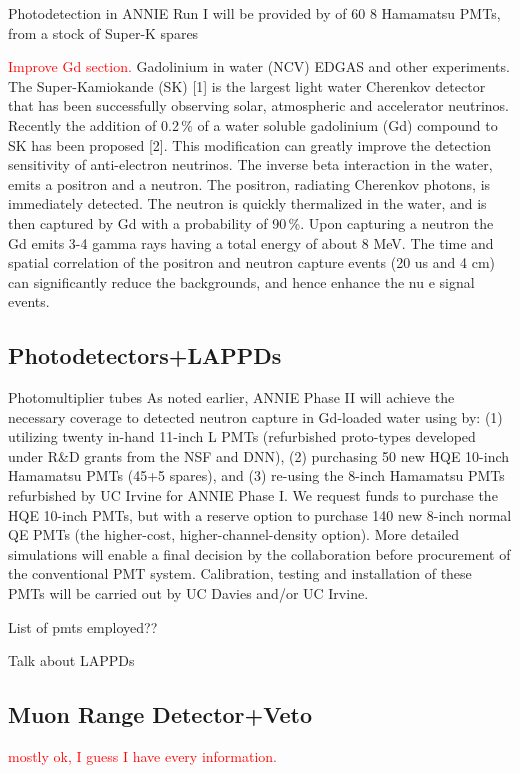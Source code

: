 Photodetection in ANNIE Run I will be provided by of 60 8 Hamamatsu PMTs, from a stock of %
Super-K spares

\textcolor{red}{Improve Gd section.}
Gadolinium in water (NCV)
EDGAS and other experiments.
The Super-Kamiokande (SK) [1] is the largest light water Cherenkov detector %
that has been successfully observing solar, atmospheric and accelerator neutrinos.
Recently the addition of 0.2\,\% of a water soluble gadolinium (Gd) compound to SK %
has been proposed [2].
This modification can greatly improve the detection sensitivity of anti-electron neutrinos.
The inverse beta interaction in the water, emits a positron and a neutron.
The positron, radiating Cherenkov photons, is immediately detected.
The neutron is quickly thermalized in the water, and is then captured by Gd with a %
probability of 90\,\%.
Upon capturing a neutron the Gd emits 3-4 gamma rays having a total energy of %
about 8 MeV.
The time and spatial correlation of the positron and neutron capture events (20 us and 4 cm) %
can significantly reduce the backgrounds, and hence enhance the nu e signal events.

\subsection{Photodetectors+LAPPDs}
\label{2.2.1}
Photomultiplier tubes
As noted earlier, ANNIE Phase II will achieve the necessary coverage to detected neutron capture
in Gd-loaded water using by: (1) utilizing twenty in-hand 11-inch L PMTs (refurbished %
proto-types developed under R\&D grants from the NSF and DNN), (2) purchasing 50 new HQE 10-inch %
Hamamatsu PMTs (45+5 spares), and (3) re-using the 8-inch Hamamatsu PMTs refurbished by %
UC Irvine for ANNIE Phase I.
We request funds to purchase the HQE 10-inch PMTs, but with a reserve option to purchase %
140 new 8-inch normal QE PMTs (the higher-cost, higher-channel-density option).
More detailed simulations will enable a final decision by the collaboration before %
procurement of the conventional PMT system.
Calibration, testing and installation of these PMTs will be carried out by UC Davies and/or UC Irvine.

List of pmts employed??

Talk about LAPPDs

\subsection[MRD and VETO]{Muon Range Detector+Veto}
\label{2.3}
\textcolor{red}{mostly ok, I guess I have every information.}

